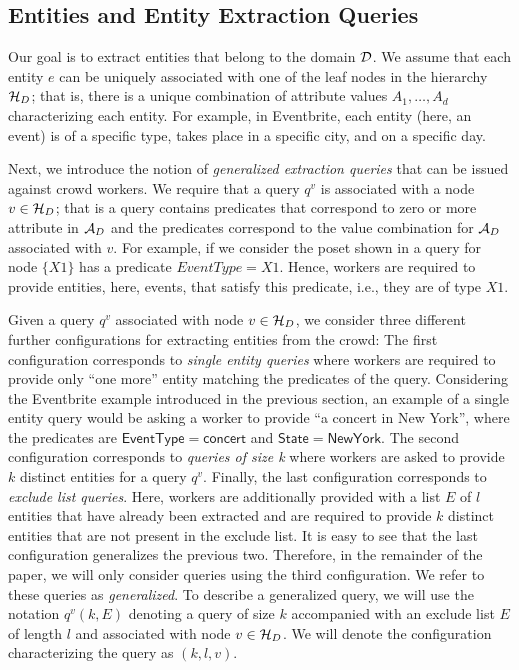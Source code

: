 \subsection{Entities and Entity Extraction Queries}
\label{sec:queries}

 Our goal is to extract entities that belong to the domain $\mathcal{D}$. We assume that each entity $e$ can be uniquely associated with one of the leaf nodes in the hierarchy $\mathcal{H}_D$; that is, there is a unique combination of attribute values $A_1, \ldots, A_d$ characterizing each entity. For example, in Eventbrite, each entity (here, an event) is of a specific type, takes place in a specific city, and on a specific day.

 Next, we introduce the notion of {\em generalized extraction queries} that can be issued against crowd workers. We require that a query $q^v$ is associated with a node $v \in \mathcal{H}_D$; that is a query contains predicates that correspond to zero or more attribute in $\mathcal{A}_D$ and the predicates correspond to the value combination for $\mathcal{A}_D$ associated with $v$. For example, if we consider the poset shown in  a query for node $\{X1\}$ has a predicate $EventType = X1$. Hence, workers are required to provide entities, here, events, that satisfy this predicate, i.e., they are of type $X1$.

Given a query $q^v$ associated with node $v \in \mathcal{H}_D$, we consider three different further configurations for  extracting entities from the crowd: The first configuration corresponds to {\em single entity queries} where workers are required to provide only ``one more'' entity matching the predicates of the query. Considering the Eventbrite example introduced in the previous section, an example of a single entity query would be asking a worker to provide ``a concert in New York'', where the predicates are $\mathsf{EventType = concert}$ and $\mathsf{State = New York}$. The second configuration corresponds to {\em queries of size k} where workers are asked to provide $k$ distinct entities for a query $q^v$. Finally, the last configuration corresponds to {\em exclude list queries}. Here,  workers are additionally provided with a list $E$ of $l$ entities that have already been extracted and are required to provide $k$ distinct entities that are not present in the exclude list. It is easy to see that the last configuration generalizes the previous two. Therefore, in the remainder of the paper, we will only consider queries using the third configuration. We refer to these queries as {\em generalized}. To describe a generalized query, we will use the notation $q^v(k,E)$ denoting a query of size $k$ accompanied with an exclude list $E$ of length $l$ and associated with node $v \in \mathcal{H}_D$. We will denote the configuration characterizing the query as $(k,l,v)$. 

